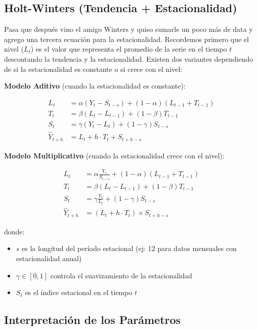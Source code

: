 \documentclass[12pt]{article}
\begin{document}
\subsection{Holt-Winters (Tendencia + Estacionalidad)}

Pasa que después vino el amigo Winters y quiso sumarle un poco más de data y agrego una tercera ecuación para la estacionalidad. Recordemos primero que el nivel ($L_t$) es el valor que representa el promedio de la serie en el tiempo $t$ descontando la tendencia y la estacionalidad. Existen dos variantes dependiendo de si la estacionalidad es constante o si crece con el nivel:

\vspace{0.5em}

\textbf{Modelo Aditivo} (cuando la estacionalidad es constante):

\begin{align*}
L_t &= \alpha (Y_t - S_{t-s}) + (1-\alpha)(L_{t-1} + T_{t-1}) \\
T_t &= \beta(L_t - L_{t-1}) + (1-\beta)T_{t-1} \\
S_t &= \gamma(Y_t - L_t) + (1-\gamma)S_{t-s} \\
\hat{Y}_{t+h} &= L_t + h \cdot T_t + S_{t+h-s}
\end{align*}

\textbf{Modelo Multiplicativo} (cuando la estacionalidad crece con el nivel):

\begin{align*}
L_t &= \alpha \frac{Y_t}{S_{t-s}} + (1-\alpha)(L_{t-1} + T_{t-1}) \\
T_t &= \beta(L_t - L_{t-1}) + (1-\beta)T_{t-1} \\
S_t &= \gamma\frac{Y_t}{L_t} + (1-\gamma)S_{t-s} \\
\hat{Y}_{t+h} &= (L_t + h \cdot T_t) \times S_{t+h-s}
\end{align*}

donde:
\begin{itemize}
    \item $s$ es la longitud del período estacional (ej: 12 para datos mensuales con estacionalidad anual)
    \item $\gamma \in [0,1]$ controla el suavizamiento de la estacionalidad
    \item $S_t$ es el índice estacional en el tiempo $t$
\end{itemize}

\subsection{Interpretación de los Parámetros}
\end{document}
